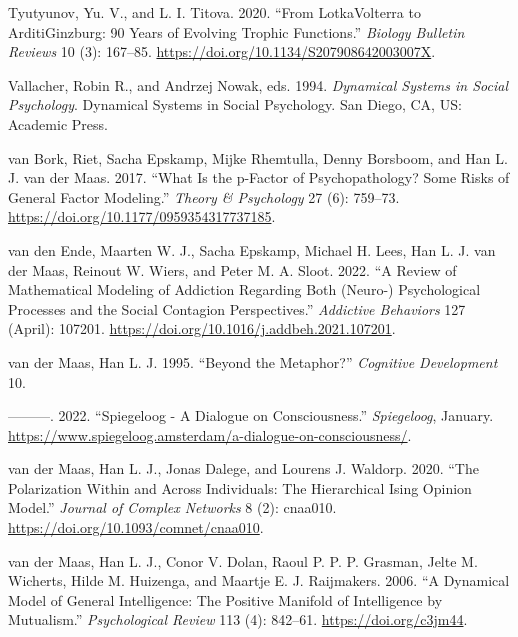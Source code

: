 \documentclass[
  a4paper,
  DIV=11,
  numbers=noendperiod,
  oneside]{scrreprt}
\newlength{\cslhangindent}
\newenvironment{CSLReferences}[2] %
 {\begin{list}{}{%
  \setlength{\itemindent}{0pt}
  \setlength{\leftmargin}{0pt}
  \setlength{\parsep}{0pt}
  \ifodd #1
   \setlength{\leftmargin}{\cslhangindent}
   \setlength{\itemindent}{-1\cslhangindent}
  \fi
  \setlength{\itemsep}{#2\baselineskip}}}
 {\end{list}}
\begin{document}
\begin{CSLReferences}{1}{0}
Tyutyunov, Yu. V., and L. I. Titova. 2020. {``From
Lotka{\textendash}Volterra to Arditi{\textendash}Ginzburg: 90 Years of
Evolving Trophic Functions.''} \emph{Biology Bulletin Reviews} 10 (3):
167--85. \url{https://doi.org/10.1134/S207908642003007X}.

Vallacher, Robin R., and Andrzej Nowak, eds. 1994. \emph{Dynamical
Systems in Social Psychology}. Dynamical Systems in Social Psychology.
{San Diego, CA, US}: {Academic Press}.

van Bork, Riet, Sacha Epskamp, Mijke Rhemtulla, Denny Borsboom, and Han
L. J. van der Maas. 2017. {``What Is the p-Factor of Psychopathology?
{Some} Risks of General Factor Modeling.''} \emph{Theory \& Psychology}
27 (6): 759--73. \url{https://doi.org/10.1177/0959354317737185}.

van den Ende, Maarten W. J., Sacha Epskamp, Michael H. Lees, Han L. J.
van der Maas, Reinout W. Wiers, and Peter M. A. Sloot. 2022. {``A Review
of Mathematical Modeling of Addiction Regarding Both (Neuro-)
Psychological Processes and the Social Contagion Perspectives.''}
\emph{Addictive Behaviors} 127 (April): 107201.
\url{https://doi.org/10.1016/j.addbeh.2021.107201}.

van der Maas, Han L. J. 1995. {``Beyond the Metaphor?''} \emph{Cognitive
Development} 10.

---------. 2022. {``Spiegeloog - A Dialogue on Consciousness.''}
\emph{Spiegeloog}, January.
\url{https://www.spiegeloog.amsterdam/a-dialogue-on-consciousness/}.

van der Maas, Han L. J., Jonas Dalege, and Lourens J. Waldorp. 2020.
{``The Polarization Within and Across Individuals: The Hierarchical
Ising Opinion Model.''} \emph{Journal of Complex Networks} 8 (2):
cnaa010. \url{https://doi.org/10.1093/comnet/cnaa010}.

van der Maas, Han L. J., Conor V. Dolan, Raoul P. P. P. Grasman, Jelte
M. Wicherts, Hilde M. Huizenga, and Maartje E. J. Raijmakers. 2006. {``A
Dynamical Model of General Intelligence: {The} Positive Manifold of
Intelligence by Mutualism.''} \emph{Psychological Review} 113 (4):
842--61. \url{https://doi.org/c3jm44}.


\end{CSLReferences}
\end{document}
